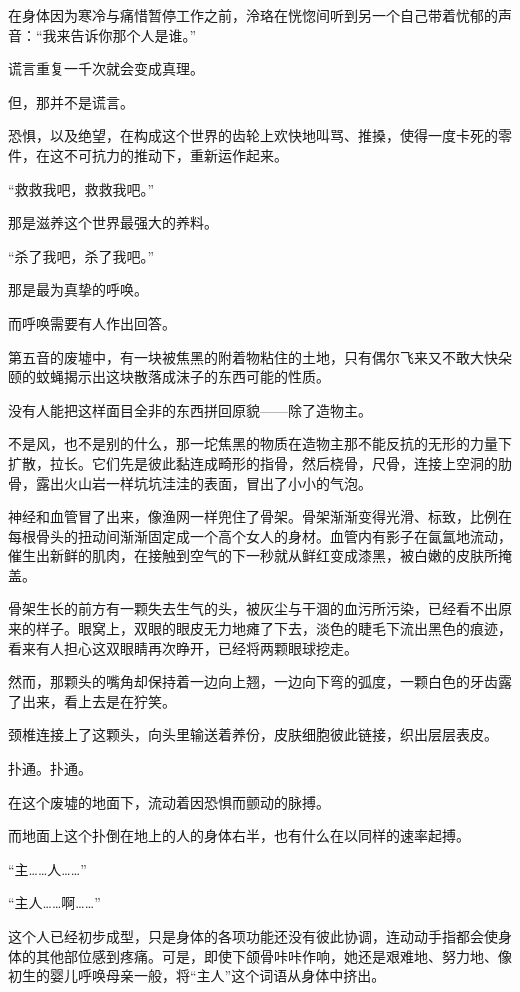 \documentclass[UTF8, scheme = chinese, openany]{ctexbook}
\begin{document}
在身体因为寒冷与痛惜暂停工作之前，泠珞在恍惚间听到另一个自己带着忧郁的声音：“我来告诉你那个人是谁。”

\vspace{1.5em}

谎言重复一千次就会变成真理。

但，那并不是谎言。

恐惧，以及绝望，在构成这个世界的齿轮上欢快地叫骂、推搡，使得一度卡死的零件，在这不可抗力的推动下，重新运作起来。

“救救我吧，救救我吧。”

那是滋养这个世界最强大的养料。

“杀了我吧，杀了我吧。”

那是最为真挚的呼唤。

而呼唤需要有人作出回答。

第五音的废墟中，有一块被焦黑的附着物粘住的土地，只有偶尔飞来又不敢大快朵颐的蚊蝇揭示出这块散落成沫子的东西可能的性质。

没有人能把这样面目全非的东西拼回原貌——除了造物主。

不是风，也不是别的什么，那一坨焦黑的物质在造物主那不能反抗的无形的力量下扩散，拉长。它们先是彼此黏连成畸形的指骨，然后桡骨，尺骨，连接上空洞的肋骨，露出火山岩一样坑坑洼洼的表面，冒出了小小的气泡。

神经和血管冒了出来，像渔网一样兜住了骨架。骨架渐渐变得光滑、标致，比例在每根骨头的扭动间渐渐固定成一个高个女人的身材。血管内有影子在氤氲地流动，催生出新鲜的肌肉，在接触到空气的下一秒就从鲜红变成漆黑，被白嫩的皮肤所掩盖。

骨架生长的前方有一颗失去生气的头，被灰尘与干涸的血污所污染，已经看不出原来的样子。眼窝上，双眼的眼皮无力地瘫了下去，淡色的睫毛下流出黑色的痕迹，看来有人担心这双眼睛再次睁开，已经将两颗眼球挖走。

然而，那颗头的嘴角却保持着一边向上翘，一边向下弯的弧度，一颗白色的牙齿露了出来，看上去是在狞笑。

颈椎连接上了这颗头，向头里输送着养份，皮肤细胞彼此链接，织出层层表皮。

扑通。扑通。

在这个废墟的地面下，流动着因恐惧而颤动的脉搏。

而地面上这个扑倒在地上的人的身体右半，也有什么在以同样的速率起搏。

“主……人……”

“主人……啊……”

这个人已经初步成型，只是身体的各项功能还没有彼此协调，连动动手指都会使身体的其他部位感到疼痛。可是，即使下颌骨咔咔作响，她还是艰难地、努力地、像初生的婴儿呼唤母亲一般，将“主人”这个词语从身体中挤出。
\end{document}
